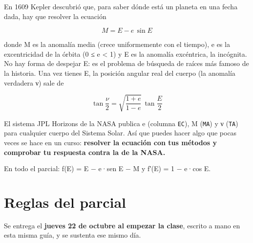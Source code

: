 
\newcommand{\docpie}{Parcial 1 · Raíces A · Kepler}

En 1609 Kepler descubrió que, para saber dónde está un planeta en una fecha dada, hay que resolver la ecuación

\[M = E - e\,\sin E\]

donde M es la anomalía media (crece uniformemente con el tiempo), e es la excentricidad de la órbita (0 ≤ e \textless{} 1) y E es la anomalía excéntrica, la incógnita. No hay forma de despejar E: es el problema de búsqueda de raíces más famoso de la historia. Una vez tienes E, la posición angular real del cuerpo (la anomalía verdadera ν) sale de

\[\tan\frac{\nu}{2} = \sqrt{\frac{1+e}{1-e}}\,\tan\frac{E}{2}\]

El sistema JPL Horizons de la NASA publica e (columna \texttt{EC}), M (\texttt{MA}) y ν (\texttt{TA}) para cualquier cuerpo del Sistema Solar. Así que puedes hacer algo que pocas veces se hace en un curso: \textbf{resolver la ecuación con tus métodos y comprobar tu respuesta contra la de la NASA.}

En todo el parcial: f(E) = E − e·sen E − M y f′(E) = 1 − e·cos E.

\section{Reglas del parcial}

Se entrega el \textbf{jueves 22 de octubre al empezar la clase}, escrito a mano en esta misma guía, y se sustenta ese mismo día.

